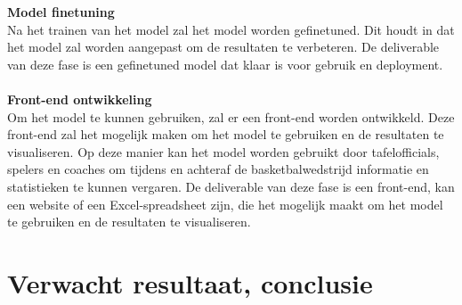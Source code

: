 \textbf{Model finetuning} \\
Na het trainen van het model zal het model worden gefinetuned. Dit houdt in dat het model zal worden aangepast om de resultaten te verbeteren.
De deliverable van deze fase is een gefinetuned model dat klaar is voor gebruik en deployment.
\\\\

\textbf{Front-end ontwikkeling} \\
Om het model te kunnen gebruiken, zal er een front-end worden ontwikkeld. Deze front-end zal het mogelijk maken om het model te gebruiken en de resultaten te visualiseren.
Op deze manier kan het model worden gebruikt door tafelofficials, spelers en coaches om tijdens en achteraf de basketbalwedstrijd informatie en statistieken te kunnen vergaren.
De deliverable van deze fase is een front-end, kan een website of een Excel-spreadsheet zijn, die het mogelijk maakt om het model te gebruiken en de resultaten te visualiseren.

\section{Verwacht resultaat, conclusie}%
\label{sec:verwachte_resultaten}





